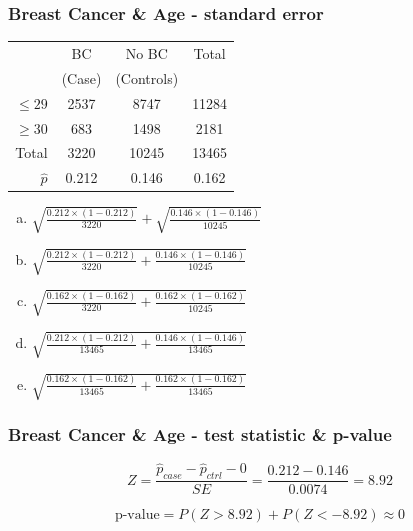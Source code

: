 \documentclass[slidestop,compress,mathserif,12pt,t,professionalfonts,xcolor=table]{beamer}
\newcommand{\solnMult}[1]{#1}
\begin{document}
\begin{frame}
\frametitle{Breast Cancer \& Age - standard error}

{
{\footnotesize
\begin{center}
\begin{tabular}{r|c|c|c}
         & BC  & No BC & Total           \\
         & (Case)          & (Controls)       &                 \\
\hline
$\le 29$ & {2537} & {8747}  & {11284}\\
$\ge 30$ & {683}  & {1498}  & {2181} \\
\hline
Total    &{3220} &{10245} & {13465}\\
\hline
$\hat{p}$ & 0.212	& 0.146	& 0.162 \\
\end{tabular}
\end{center}
}
}

{\small
\begin{enumerate}[(a)]
\item $ \sqrt{ \frac{0.212 \times (1-0.212)}{3220}} + \sqrt{ \frac{0.146 \times (1-0.146)}{10245} }$
\item $ \sqrt{ \frac{0.212 \times (1-0.212)}{3220} + \frac{0.146 \times (1-0.146)}{10245} }$
\item \solnMult{ $ \sqrt{ \frac{0.162 \times (1-0.162)}{3220} + \frac{0.162 \times (1-0.162)}{10245} }$ } 
\item $ \sqrt{ \frac{0.212 \times (1-0.212)}{13465} + \frac{0.146 \times (1-0.146)}{13465} }$
\item $ \sqrt{ \frac{0.162 \times (1-0.162)}{13465} + \frac{0.162 \times (1-0.162)}{13465} }$
\end{enumerate}
}

\end{frame}


\begin{frame}
\frametitle{Breast Cancer \& Age - test statistic \& p-value}

\[ Z = \frac{\hat{p}_{case}-\hat{p}_{ctrl} - 0}{SE} = \frac{0.212 - 0.146}{0.0074} = 8.92 \]

\pause

\[ \text{p-value} = P(Z > 8.92)+P(Z<-8.92) \approx 0 \]

\end{frame}
\end{document}
